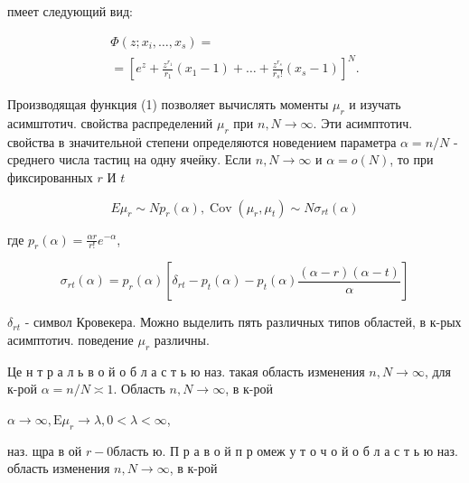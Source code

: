 \documentclass[10pt]{article}
\begin{document}
пмеет следующий вид:



\[

\begin{gathered}

\Phi\left(z ; x_{i}, \ldots, x_{s}\right)= \\

=\left[e^{z}+\frac{z^{r_{1}}}{r_{1}}\left(x_{1}-1\right)+\ldots+\frac{z^{r_{s}}}{r_{s} !}\left(x_{s}-1\right)\right]^{N} .

\end{gathered}

\]



Производящая функция (1) позволяет вычислять моменты $\mu_{r}$ и изучать асимштотич. свойства распределений $\mu_{r}$ при $n, N \rightarrow \infty$. Эти асимптотич. свойства в значительноӥ степени определяются новедением параметра $\alpha=n / N$ - среднего числа тастиц на одну ячеӥку. Если $n, N \rightarrow \infty$ и $\alpha=o(N)$, то при фиксированных $r$ И $t$



\[

E \mu_{r} \sim N p_{r}(\alpha), \operatorname{Cov}\left(\mu_{r}, \mu_{t}\right) \sim N \sigma_{r t}(\alpha)

\]



где $p_{r}(\alpha)=\frac{\alpha r}{r !} e^{-\alpha}$,



\[

\sigma_{r t}(\alpha)=p_{r}(\alpha)\left[\delta_{r t}-p_{t}(\alpha)-p_{t}(\alpha) \frac{(\alpha-r)(\alpha-t)}{\alpha}\right]

\]



$\delta_{r t}$ - символ Кровекера. Можно выделить пять различных типов областей, в к-рых асимптотич. поведение $\mu_{r}$ различны.



Це н т р а л ь в о й о б л а с т ь ю наз. такая область изменения $n, N \rightarrow \infty$, для к-рой $\alpha=n / N \asymp 1$. Область $n, N \rightarrow \infty$, в к-роӥ



$\alpha \longrightarrow \infty, \mathrm{E} \mu_{r} \rightarrow \lambda, 0<\lambda<\infty$,



наз. щра в ой $r-0 б л а с т ь$ ю. П р а в о й п р омеж у т о ч о й $о$ б л а с т ь ю наз. область изменения $n, N \rightarrow \infty$, в к-рой
\end{document}
